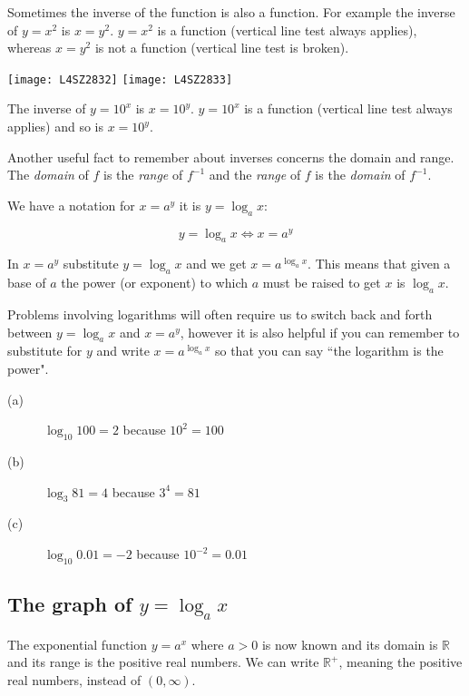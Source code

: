 Sometimes the inverse of the function is also a function. For example the inverse of $y =x^{2}$ is $x =y^{2}$. $y =x^{2}$ is a function (vertical line test always applies), whereas $x =y^{2}$ is not a function (vertical line test is broken). 

\begin{multicols}{2}
\texttt{[image: L4SZ2832]}
\texttt{[image: L4SZ2833]}
\end{multicols}

The inverse of $y =10^{x}$ is $x =10^{y}$. $y =10^{x}$ is a function (vertical line test always applies) and so is $x =10^{y}$. 

Another useful fact to remember about inverses concerns the domain and range. The \emph{domain}
of $f$ is the \emph{range} of $f^{ -1}$ and the \emph{range} of $f$ is the \emph{domain} of $f^{ -1}$. 

We have a notation for $x =a^{y}$ it is $y =\log _{a} x$:
\begin{tcolorbox}
\[y =\log _{a} x \Leftrightarrow x =a^y
\]
\end{tcolorbox}


In $x =a^{y}$ substitute $y =\log _{a} x$ and we get $x =a^{\log _{a} x}$. This means that given a base of $a$ the power (or exponent) to which $a$ must be raised to get $x$ is $\log _{a} x$. 

Problems involving logarithms will often require us to switch back and forth between $y =\log _{a} x$ and $x =a^{y}$, however it is also helpful if you can remember to substitute for $y$ and write $x =a^{\log _{a} x}$ so that you can say ``the logarithm is the power". 

\example
\begin{description}
	\item [(a)] $\log _{10} 100 =2$ because $10^{2} =100$ 
	
	\item [(b)] $\log _{3} 81 =4$ because $3^{4} =81$ 
	
	\item [(c)] $\log _{10} 0.01 = -2$ because $10^{ -2} =0.01$ \end{description}

\subsection*{The graph of $y =\log _{a} x$}
The exponential function $y =a^{x}$ where $a >0$ is now known and its domain is $\mathbb{R}$ and its range is the positive real numbers. We can write $\mathbb{R}^{ +}$, meaning the positive real numbers, instead of $(0 ,\infty)$. 

